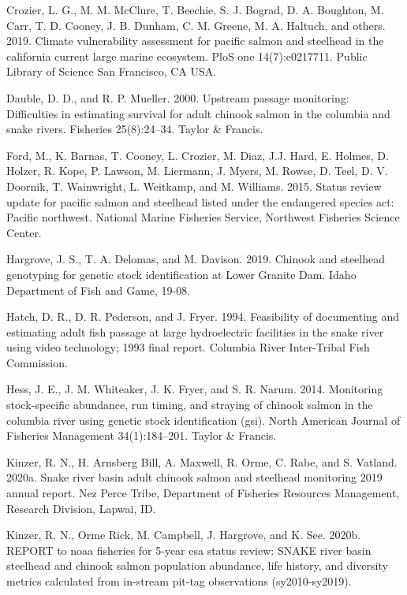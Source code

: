 \documentclass[
  12pt,
]{article}
\begin{document}
\leavevmode\hypertarget{ref-crozier2019climate}{}%
Crozier, L. G., M. M. McClure, T. Beechie, S. J. Bograd, D. A. Boughton, M. Carr, T. D. Cooney, J. B. Dunham, C. M. Greene, M. A. Haltuch, and others. 2019. Climate vulnerability assessment for pacific salmon and steelhead in the california current large marine ecosystem. PloS one 14(7):e0217711. Public Library of Science San Francisco, CA USA.

\leavevmode\hypertarget{ref-Dauble2000}{}%
Dauble, D. D., and R. P. Mueller. 2000. Upstream passage monitoring: Difficulties in estimating survival for adult chinook salmon in the columbia and snake rivers. Fisheries 25(8):24--34. Taylor \& Francis.

\leavevmode\hypertarget{ref-nwfsc2015}{}%
Ford, M., K. Barnas, T. Cooney, L. Crozier, M. Diaz, J.J. Hard, E. Holmes, D. Holzer, R. Kope, P. Lawson, M. Liermann, J. Myers, M. Rowse, D. Teel, D. V. Doornik, T. Wainwright, L. Weitkamp, and M. Williams. 2015. Status review update for pacific salmon and steelhead listed under the endangered species act: Pacific northwest. National Marine Fisheries Service, Northwest Fisheries Science Center.

\leavevmode\hypertarget{ref-Hargrove2019}{}%
Hargrove, J. S., T. A. Delomas, and M. Davison. 2019. Chinook and steelhead genotyping for genetic stock identification at Lower Granite Dam. Idaho Department of Fish and Game, 19-08.

\leavevmode\hypertarget{ref-Hatch1994}{}%
Hatch, D. R., D. R. Pederson, and J. Fryer. 1994. Feasibility of documenting and estimating adult fish passage at large hydroelectric facilities in the snake river using video technology; 1993 final report. Columbia River Inter-Tribal Fish Commission.

\leavevmode\hypertarget{ref-hess2014monitoring}{}%
Hess, J. E., J. M. Whiteaker, J. K. Fryer, and S. R. Narum. 2014. Monitoring stock-specific abundance, run timing, and straying of chinook salmon in the columbia river using genetic stock identification (gsi). North American Journal of Fisheries Management 34(1):184--201. Taylor \& Francis.

\leavevmode\hypertarget{ref-kinzer2020report}{}%
Kinzer, R. N., H. Arnsberg Bill, A. Maxwell, R. Orme, C. Rabe, and S. Vatland. 2020a. Snake river basin adult chinook salmon and steelhead monitoring 2019 annual report. Nez Perce Tribe, Department of Fisheries Resources Management, Research Division, Lapwai, ID.

\leavevmode\hypertarget{ref-iptds2020report}{}%
Kinzer, R. N., Orme Rick, M. Campbell, J. Hargrove, and K. See. 2020b. REPORT to noaa fisheries for 5-year esa status review: SNAKE river basin steelhead and chinook salmon population abundance, life history, and diversity metrics calculated from in-stream pit-tag observations (sy2010-sy2019).
\end{document}

